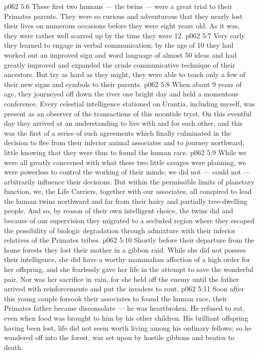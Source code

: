\vs p062 5:6 These first two humans --- the twins --- were a great trial to their Primates parents. They were so curious and adventurous that they nearly lost their lives on numerous occasions before they were eight years old. As it was, they were rather well scarred up by the time they were 12.
\vs p062 5:7 Very early they learned to engage in verbal communication; by the age of 10 they had worked out an improved sign and word language of almost 50 ideas and had greatly improved and expanded the crude communicative technique of their ancestors. But try as hard as they might, they were able to teach only a few of their new signs and symbols to their parents.
\vs p062 5:8 When about 9 years of age, they journeyed off down the river one bright day and held a momentous conference. Every celestial intelligence stationed on Urantia, including myself, was present as an observer of the transactions of this noontide tryst. On this eventful day they arrived at an understanding to live with and for each other, and this was the first of a series of such agreements which finally culminated in the decision to flee from their inferior animal associates and to journey northward, little knowing that they were thus to found the human race.
\vs p062 5:9 While we were all greatly concerned with what these two little savages were planning, we were powerless to control the working of their minds; we did not --- could not --- arbitrarily influence their decisions. But within the permissible limits of planetary function, we, the Life Carriers, together with our associates, all conspired to lead the human twins northward and far from their hairy and partially tree\hyp{}dwelling people. And so, by reason of their own intelligent choice, the twins did  and because of our supervision they migrated  to a secluded region where they escaped the possibility of biologic degradation through admixture with their inferior relatives of the Primates tribes.
\vs p062 5:10 Shortly before their departure from the home forests they lost their mother in a gibbon raid. While she did not possess their intelligence, she did have a worthy mammalian affection of a high order for her offspring, and she fearlessly gave her life in the attempt to save the wonderful pair. Nor was her sacrifice in vain, for she held off the enemy until the father arrived with reinforcements and put the invaders to rout.
\vs p062 5:11 Soon after this young couple forsook their associates to found the human race, their Primates father became disconsolate --- he was heartbroken. He refused to eat, even when food was brought to him by his other children. His brilliant offspring having been lost, life did not seem worth living among his ordinary fellows; so he wandered off into the forest, was set upon by hostile gibbons and beaten to death.
